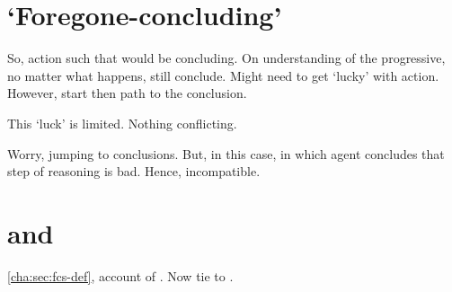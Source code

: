 \section{`Foregone-concluding'}
\label{sec:fc-progressive}

\begin{note}
  So, action such that would be concluding.
  On understanding of the progressive, no matter what happens, still conclude.
  Might need to get `lucky' with action.
  However, start then path to the conclusion.

  This `luck' is limited.
  Nothing conflicting.
\end{note}

\begin{note}
  Worry, jumping to conclusions.
  But, in this case, \pevent{} in which agent concludes that step of reasoning is bad.
  Hence, incompatible.
\end{note}

\section{ and }
\label{cha:fcs:sec:fcs-support}

\begin{note}
  \autoref{cha:sec:fcs-def}, account of .
  Now tie to .
\end{note}


